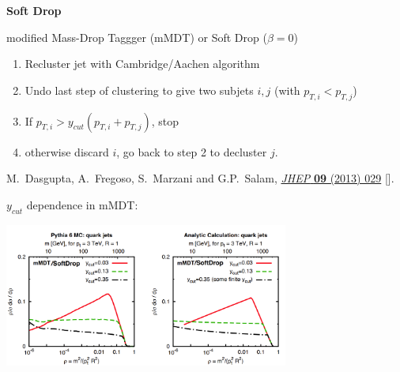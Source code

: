 \documentclass[9pt,a4paper,unknownkeysallowed,xcolor=dvipsnames,aspectratio=43]{beamer}
\begin{document}
%
%
\begin{frame}{\bf \huge Soft Drop}

{\color{darkred}{\Large$\bullet$} modified Mass-Drop Taggger (mMDT) or Soft Drop ($\beta=0$)}
\begin{enumerate}
    \item Recluster jet with Cambridge/Aachen algorithm 
    \item Undo last step of clustering to give two subjets $i,j$ (with $p_{T,i} < p_{T,j}$) 
    \item If $p_{T,i} > y_{cut} (p_{T,i} + p_{T,j})$, stop \item otherwise discard $i$, go back to step 2 to decluster $j$.
\end{enumerate}
\begin{center}
    {\tiny \color{teablue} M.~Dasgupta, A.~Fregoso, S.~Marzani and G.P.~Salam, %
  \href{https://doi.org/10.1007/JHEP09(2013)029}{\emph{JHEP} {\bfseries 09}
  (2013) 029} [\href{https://arxiv.org/abs/1307.0007}{{}}].}
\end{center}

{\color{darkred}{\Large$\bullet$}} $y_{cut}$ dependence in mMDT:
\begin{center}
\includegraphics[width=0.7\textwidth]{05/softdrop.png}
\end{center}
\end{frame}
%
%
\end{document}
